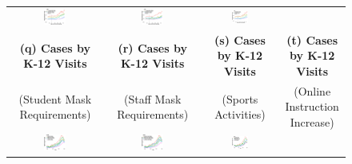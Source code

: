 \documentclass[9pt,twoside,lineno]{pnas-new}
\theoremstyle{definition}
\begin{document}
\begin{figure}[ht]
{\begin{minipage}{\linewidth}
\begin{tabular}{cccc}
      \includegraphics[width=0.25\textwidth]{tables_and_figures/schoolmode-event-staff-newdeaths}&  
      \includegraphics[width=0.25\textwidth]{tables_and_figures/schoolmode-event-sports-newdeaths}&  
      \includegraphics[width=0.25\textwidth]{tables_and_figures/schoolmode-event-online-newdeaths}  \\  
      \textbf{(q) Cases by K-12 Visits }&\textbf{(r) Cases by K-12 Visits }&\textbf{(s) Cases by K-12 Visits }&\textbf{(t) Cases by K-12 Visits } \\
    (Student Mask Requirements)&(Staff Mask Requirements)&   (Sports Activities)&   (Online Instruction Increase) \\  
      \includegraphics[width=0.25\textwidth]{tables_and_figures/school-weekcase-simple}&  
      \includegraphics[width=0.25\textwidth]{tables_and_figures/school-weekcase-staff-simple}&  
      \includegraphics[width=0.25\textwidth]{tables_and_figures/school-weekcase-sports-simple}&  

\end{tabular}
\end{minipage}}
\end{figure}
\end{document}
